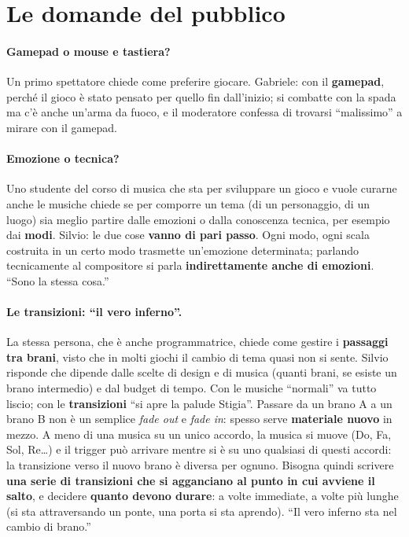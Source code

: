\section{Le domande del pubblico}
\label{sec:c1-5-domande}

\paragraph{Gamepad o mouse e tastiera?} Un primo spettatore chiede come preferire
giocare. Gabriele: con il \textbf{gamepad}, perché il gioco è stato pensato per
quello fin dall'inizio; si combatte con la spada ma c'è anche un'arma da fuoco,
e il moderatore confessa di trovarsi ``malissimo'' a mirare con il gamepad.

\paragraph{Emozione o tecnica?} Uno studente del corso di musica che sta per
sviluppare un gioco e vuole curarne anche le musiche chiede se per comporre un
tema (di un personaggio, di un luogo) sia meglio partire dalle emozioni o dalla
conoscenza tecnica, per esempio dai \textbf{modi}. Silvio: le due cose
\textbf{vanno di pari passo}. Ogni modo, ogni scala costruita in un certo modo
trasmette un'emozione determinata; parlando tecnicamente al compositore si parla
\textbf{indirettamente anche di emozioni}. ``Sono la stessa cosa.''

\paragraph{Le transizioni: ``il vero inferno''.} La stessa persona, che è anche
programmatrice, chiede come gestire i \textbf{passaggi tra brani}, visto che in
molti giochi il cambio di tema quasi non si sente. Silvio risponde che dipende
dalle scelte di design e di musica (quanti brani, se esiste un brano intermedio)
e dal budget di tempo. Con le musiche ``normali'' va tutto liscio; con le
\textbf{transizioni} ``si apre la palude Stigia''. Passare da un brano A a un
brano B non è un semplice \emph{fade out} e \emph{fade in}: spesso serve
\textbf{materiale nuovo} in mezzo. A meno di una musica su un unico accordo, la
musica si muove (Do, Fa, Sol, Re\dots) e il trigger può arrivare mentre si è su
uno qualsiasi di questi accordi: la transizione verso il nuovo brano è diversa
per ognuno. Bisogna quindi scrivere \textbf{una serie di transizioni che si
agganciano al punto in cui avviene il salto}, e decidere \textbf{quanto devono
durare}: a volte immediate, a volte più lunghe (si sta attraversando un ponte, una
porta si sta aprendo). ``Il vero inferno sta nel cambio di brano.''

